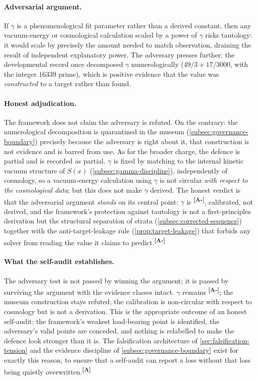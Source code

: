 \documentclass[12pt,a4paper,twoside]{article}
\theoremstyle{plain}
\theoremstyle{definition}
\theoremstyle{remark}
\newcommand{\catmark}[1]{\textsuperscript{\textsf{\textbf{[#1]}}}}
\newcommand{\Sx}{S(x)}
\begin{document}
\paragraph{Adversarial argument.}
If $\gamma$ is a phenomenological fit parameter rather than a derived constant, then any vacuum-energy or cosmological calculation scaled by a power of $\gamma$ risks tautology: it would scale by precisely the amount needed to match observation, draining the result of independent explanatory power. The adversary presses further: the developmental record once decomposed $\gamma$ numerologically ($49/3 + 17/3000$, with the integer $16339$ prime), which is positive evidence that the value was \emph{constructed} to a target rather than found.

\paragraph{Honest adjudication.}
The framework does not claim the adversary is refuted. On the contrary: the numerological decomposition is quarantined in the museum (\cref{subsec:governance-boundary}) precisely because the adversary is right about it, that construction is not evidence and is barred from use. As for the broader charge, the defence is partial and is recorded as partial. $\gamma$ is fixed by matching to the internal kinetic vacuum structure of $\Sx$ (\cref{subsec:gamma-discipline}), independently of cosmology, so a vacuum-energy calculation using $\gamma$ is not circular \emph{with respect to the cosmological data}; but this does not make $\gamma$ derived. The honest verdict is that the adversarial argument \emph{stands} on its central point: $\gamma$ is \catmark{A-}, calibrated, not derived, and the framework's protection against tautology is not a first-principles derivation but the structural separation of strata (\cref{subsec:corrected-sequence}) together with the anti-target-leakage rule (\cref{prop:target-leakage}) that forbids any solver from reading the value it claims to predict.\catmark{A-}

\paragraph{What the self-audit establishes.}
The adversary test is not passed by winning the argument; it is passed by surviving the argument with the evidence classes intact. $\gamma$ remains \catmark{A-}; the museum construction stays refuted; the calibration is non-circular with respect to cosmology but is not a derivation. This is the appropriate outcome of an honest self-audit: the framework's weakest load-bearing point is identified, the adversary's valid points are conceded, and nothing is relabelled to make the defence look stronger than it is. The falsification architecture of \cref{sec:falsification-tension} and the evidence discipline of \cref{subsec:governance-boundary} exist for exactly this reason, to ensure that a self-audit can report a loss without that loss being quietly overwritten.\catmark{A}
\end{document}
